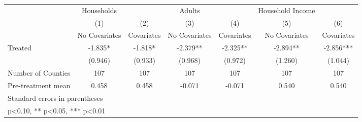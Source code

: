 {
\def\sym#1{\ifmmode^{#1}\else\(^{#1}\)\fi}
\begin{tabular}{l*{6}{c}}
\hline\hline
            &  Households   &               &      Adults   &               &Household Income   &               \\
            &\multicolumn{1}{c}{(1)}&\multicolumn{1}{c}{(2)}&\multicolumn{1}{c}{(3)}&\multicolumn{1}{c}{(4)}&\multicolumn{1}{c}{(5)}&\multicolumn{1}{c}{(6)}\\
            &\multicolumn{1}{c}{No Covariates}&\multicolumn{1}{c}{Covariates}&\multicolumn{1}{c}{No Covariates}&\multicolumn{1}{c}{Covariates}&\multicolumn{1}{c}{No Covariates}&\multicolumn{1}{c}{Covariates}\\
\hline
Treated     &      -1.835*  &      -1.818*  &      -2.379** &      -2.325** &      -2.894** &      -2.856***\\
            &     (0.946)   &     (0.933)   &     (0.968)   &     (0.972)   &     (1.260)   &     (1.044)   \\
\hline
Number of Counties&         107   &         107   &         107   &         107   &         107   &         107   \\
Pre-treatment mean&       0.458   &       0.458   &      -0.071   &      -0.071   &       0.540   &       0.540   \\
\hline\hline
\multicolumn{7}{l}{\footnotesize Standard errors in parentheses}\\
\multicolumn{7}{l}{\footnotesize * p<0.10, ** p<0.05, *** p<0.01}\\
\end{tabular}
}
